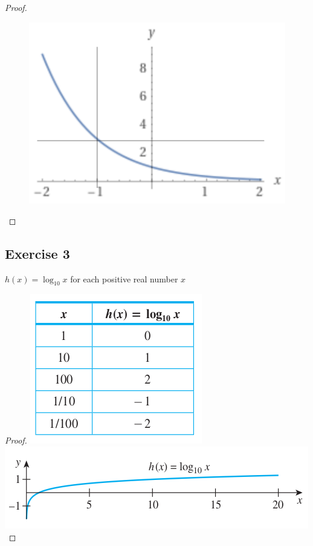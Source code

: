 \documentclass[14pt]{extarticle}
\begin{document}
\begin{proof}
\begin{figure}[ht!]
\centering
\includegraphics[scale=0.5]{../images/11.4.2.png}
\end{figure}
\end{proof}

\subsection{Exercise 3}
\(h(x) = \log_{10} x\) for each positive real number \(x\)

\begin{proof}
\includegraphics[scale=0.5]{../images/11.4.3.1.png}
\includegraphics[scale=0.5]{../images/11.4.3.2.png}
\end{proof}
\end{document}
